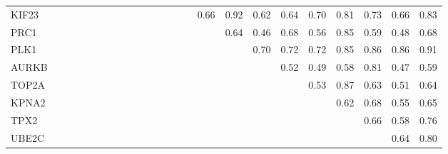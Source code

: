 \begin{longtable}{lrrrrrrrrrrrrrrrrrrrrrrr}
KIF23  &              &            &             &             &            &             &             &              &             &             &              &              &             &             &       0.66 &       0.92 &        0.62 &        0.64 &        0.70 &       0.81 &        0.73 &        0.66 &        0.83 \\
PRC1   &              &            &             &             &            &             &             &              &             &             &              &              &             &             &            &       0.64 &        0.46 &        0.68 &        0.56 &       0.85 &        0.59 &        0.48 &        0.68 \\
PLK1   &              &            &             &             &            &             &             &              &             &             &              &              &             &             &            &            &        0.70 &        0.72 &        0.72 &       0.85 &        0.86 &        0.86 &        0.91 \\
AURKB  &              &            &             &             &            &             &             &              &             &             &              &              &             &             &            &            &             &        0.52 &        0.49 &       0.58 &        0.81 &        0.47 &        0.59 \\
TOP2A  &              &            &             &             &            &             &             &              &             &             &              &              &             &             &            &            &             &             &        0.53 &       0.87 &        0.63 &        0.51 &        0.64 \\
KPNA2  &              &            &             &             &            &             &             &              &             &             &              &              &             &             &            &            &             &             &             &       0.62 &        0.68 &        0.55 &        0.65 \\
TPX2   &              &            &             &             &            &             &             &              &             &             &              &              &             &             &            &            &             &             &             &            &        0.66 &        0.58 &        0.76 \\
UBE2C  &              &            &             &             &            &             &             &              &             &             &              &              &             &             &            &            &             &             &             &            &             &        0.64 &        0.80 \\

\end{longtable}
